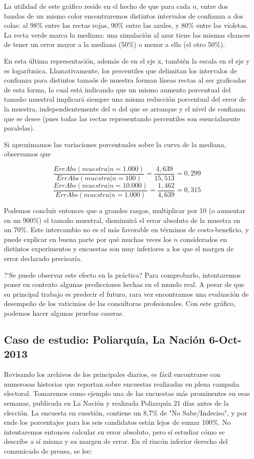 \documentclass[12pt, a4paper]{article}
\begin{document}
La utilidad de este gr\'afico reside en el hecho de que para cada $n$, entre dos bandas de un mismo color encontraremos distintos intervalos de confianza a dos colas: al 98\% entre las rectas rojas, 90\% entre las azules, y 80\% entre las violetas. La recta verde marca la mediana: una simulaci\'on al azar tiene las mismas chances de tener un error mayor a la mediana (50\%) o menor a ella (el otro 50\%).

En esta \'ultima representaci\'on, adem\'as de en el eje x, tambi\'en la escala en el eje y es logar\'itmica. Llamativamente, los percentiles que delimitan los intervalos de confianza para distintos tama\~os de muestra forman l\'ineas rectas al ser graficadas de esta forma, lo cual est\'a indicando que un mismo aumento porcentual del tama\~no muestral implicar\'a siempre una misma reducci\'on porcentual del error de la muestra, independientemente del $n$ del que se arranque y el nivel de confianza que se desee (pues todas las rectas representando percentiles son esencialmente paralelas).

Si aproximamos las variaciones porcentuales sobre la curva de la mediana, observamos que 

$$ \frac{ErrAbs(muestra| n= 1.000)}{ErrAbs(muestra| n= 100)} = \frac{4,639}{15,513} = 0,299 $$
$$ \frac{ErrAbs(muestra| n= 10.000)}{ErrAbs(muestra| n= 1.000)} = \frac{1,462}{4,639} = 0,315 $$

Podemos concluir entonces que a grandes rasgos, multiplicar por 10 (o aumentar en un 900\%) el tama\~no muestral, disminuir\'a el error absoluto de la muestra en un 70\%. Este intercambio no es el m\'as favorable en t\'erminos de costo-beneficio, y puede explicar en buena parte por qu\'e muchas veces los $n$ considerados en distintos experimentos y encuestas son muy inferiores a los que el margen de error declarado precisar\'ia.

?`Se puede observar este efecto en la pr\'actica? Para comprobarlo, intentaremos poner en contexto algunas predicciones hechas en el mundo real. A pesar de que su principal trabajo es predecir el futuro, rara vez encontramos una evaluaci\'on de desempe\~no de los vaticinios de las consultoras profesionales. Con este gr\'afico, podemos hacer algunas pruebas caseras.

\subsection{Caso de estudio: Poliarqu\'ia, La Naci\'on 6-Oct-2013}

Revisando los archivos de los principales diarios, es f\'acil encontrarse con numerosas historias que reportan sobre encuestas realizadas en plena campa\~na electoral. Tomaremos como ejemplo una de las encuestas m\'as prominentes en esas semanas, publicada en La Naci\'on y realizada Poliarqu\'ia 21 d\'ias antes de la elecci\'on. La encuesta en cuesti\'on, contiene un 8,7\% de "No Sabe/Indeciso", y por ende los porcentajes para los seis candidatos est\'an lejos de sumar 100\%. No intentaremos entonces calcular su error absoluto, pero s\'i estudiar c\'omo se describe a s\'i misma y su margen de error. En el rinc\'on inferior derecho del comunicado de prensa, se lee:
\end{document}
